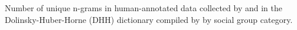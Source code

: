 Number of unique n-grams in human-annotated data collected by \citet{thau_how_2019} and in the Dolinsky-Huber-Horne (DHH) dictionary compiled by \citet{dolinsky_parties_2023} by social group category. \label{fig:thau_n_grams_by_category}
